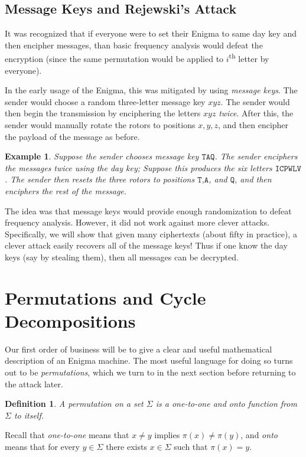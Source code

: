 \documentclass[11pt]{article}
\newtheorem{definition}{Definition}
\newtheorem{example}{Example}
\begin{document}
\subsection{Message Keys and Rejewski's Attack}

It was recognized that if everyone were to set their Enigma to same day key and
then encipher messages, than basic frequency analysis would defeat the
encryption (since the same permutation would be applied to
$i$\textsuperscript{th} letter by everyone).  

In the early usage of the Enigma, this was mitigated by using \emph{message
keys}. The sender would choose a random three-letter message key $xyz$.
The sender would then begin the transmission by enciphering the letters
$xyz$ \emph{twice}. After this, the sender would manually rotate the
rotors to positions $x,y,z$, and then encipher the payload of the message
as before.

\begin{example}
    Suppose the sender chooses message key $\mathtt{TAQ}$. The sender enciphers
    the messages twice using the day key; Suppose this produces the six letters
    $\mathtt{ICPWLV}$. The sender then resets the three rotors to positions
    $\mathtt{T}$,$\mathtt{A}$, and $\mathtt{Q}$, and then enciphers the
    rest of the message.
\end{example}

The idea was that message keys would provide enough randomization to defeat
frequency analysis. However, it did not work against more clever attacks.
Specifically, we will show that given many ciphertexts (about fifty in
practice), a clever attack easily recovers all of the message keys!  Thus if
one know the day keys (say by stealing them), then all messages can be
decrypted. 

\section{Permutations and Cycle Decompositions}

Our first order of business will be to give a clear and useful mathematical
description of an Enigma machine. The most useful language for doing so turns
out to be \emph{permutations}, which we turn to in the next section before
returning to the attack later.


\begin{definition}
    A \emph{permutation on a set $\Sigma$} is a one-to-one and onto
    function from $\Sigma$ to itself.
\end{definition}
Recall that \emph{one-to-one} means that $x\neq y$ implies $\pi(x)\neq \pi(y)$,
and \emph{onto} means that for every $y\in\Sigma$ there exists $x\in\Sigma$
such that $\pi(x)=y$.
\end{document}
